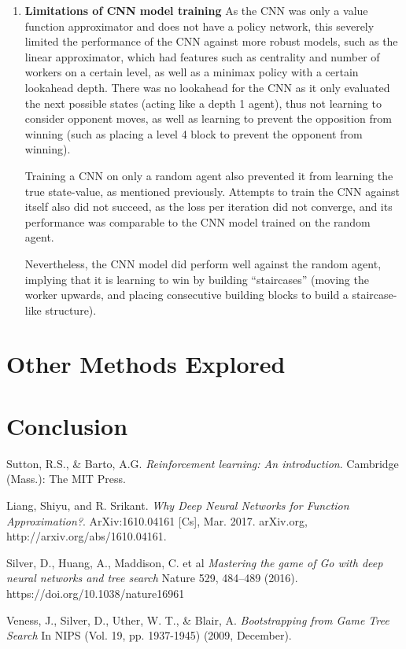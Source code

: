 \documentclass[a4paper,12pt,table]{article}
\begin{document}
\begin{enumerate}
    \item \textbf{Limitations of CNN model training}
    \newline
    As the CNN was only a value function approximator and does not have a policy network, this severely limited the performance of the CNN against more robust models, such as the linear approximator, which had features such as centrality and number of workers on a certain level, as well as a minimax policy with a certain lookahead depth. There was no lookahead for the CNN as it only evaluated the next possible states (acting like a depth 1 agent), thus not learning to consider opponent moves, as well as learning to prevent the opposition from winning (such as placing a level 4 block to prevent the opponent from winning).  \par

    Training a CNN on only a random agent also prevented it from learning the true state-value, as mentioned previously. Attempts to train the CNN against itself also did not succeed, as the loss per iteration did not converge, and its performance was comparable to the CNN model trained on the random agent. \par

    Nevertheless, the CNN model did perform well against the random agent, implying that it is learning to win by building “staircases” (moving the worker upwards, and placing consecutive building blocks to build a staircase-like structure).  \par

\end{enumerate}

\section{Other Methods Explored}

\section{Conclusion}

\begin{thebibliography}{9}
    Sutton, R.S., \& Barto, A.G. 
    \textit{Reinforcement learning: An introduction}. 
    Cambridge (Mass.): The MIT Press.
    
    Liang, Shiyu, and R. Srikant. 
    \textit{Why Deep Neural Networks for Function Approximation?}. 
    ArXiv:1610.04161 [Cs], Mar. 2017. arXiv.org, http://arxiv.org/abs/1610.04161.

    Silver, D., Huang, A., Maddison, C. et al
    \textit{Mastering the game of Go with deep neural networks and tree search}
    Nature 529, 484–489 (2016). https://doi.org/10.1038/nature16961

    Veness, J., Silver, D., Uther, W. T., \& Blair, A.
    \textit{Bootstrapping from Game Tree Search}
    In NIPS (Vol. 19, pp. 1937-1945) (2009, December).

\end{thebibliography}
\end{document}
